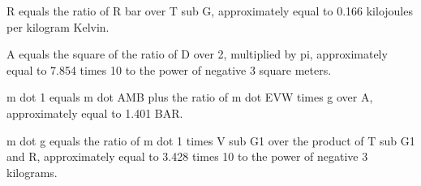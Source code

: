 R equals the ratio of R bar over T sub G, approximately equal to 0.166 kilojoules per kilogram Kelvin.

A equals the square of the ratio of D over 2, multiplied by pi, approximately equal to 7.854 times 10 to the power of negative 3 square meters.

m dot 1 equals m dot AMB plus the ratio of m dot EVW times g over A, approximately equal to 1.401 BAR.

m dot g equals the ratio of m dot 1 times V sub G1 over the product of T sub G1 and R, approximately equal to 3.428 times 10 to the power of negative 3 kilograms.